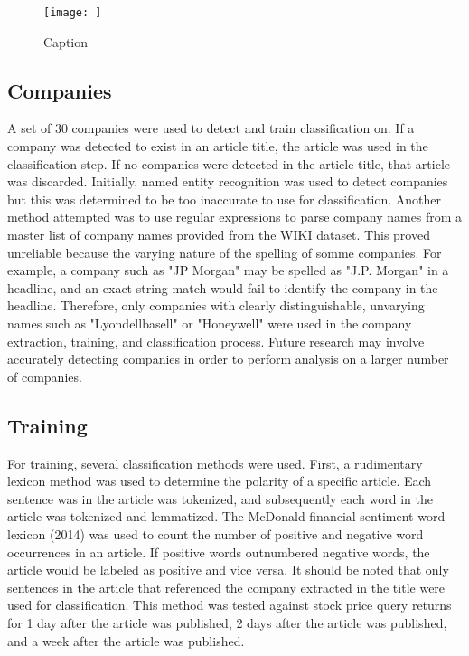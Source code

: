 \documentclass{article}
\begin{document}
    \begin{figure}
        \centering
        \texttt{[image: ]}
        \caption{Caption}
        \label{fig:my_label}
    \end{figure}
    
    \subsection{Companies}
    A set of 30 companies were used to detect and train classification on. If a company was detected to exist in an article title, the article was used in the classification step. If no companies were detected in the article title, that article was discarded. Initially, named entity recognition was used to detect companies but this was determined to be too inaccurate to use for classification. Another method attempted was to use regular expressions to parse company names from a master list of company names provided from the WIKI dataset. This proved unreliable because the varying nature of the spelling of somme companies. For example, a company such as "JP Morgan" may be spelled as "J.P. Morgan" in a headline, and an exact string match would fail to identify the company in the headline. Therefore, only companies with clearly distinguishable, unvarying names such as "Lyondellbasell" or "Honeywell" were used in the company extraction, training, and classification process.  Future research may involve accurately detecting companies in order to perform analysis on a larger number of companies. 
    
    \subsection{Training}
    
    For training, several classification methods were used. First, a rudimentary lexicon method was used to determine the polarity of a specific article. Each sentence was in the article was tokenized, and subsequently each word in the article was tokenized and lemmatized. The McDonald financial sentiment word lexicon (2014) was used to count the number of positive and negative word occurrences in an article. If positive words outnumbered negative words, the article would be labeled as positive and vice versa. It should be noted that only sentences in the article that referenced the company extracted in the title were used for classification. This method was tested against stock price query returns for 1 day after the article was published, 2 days after the article was published, and a week after the article was published.
    
\end{document}
